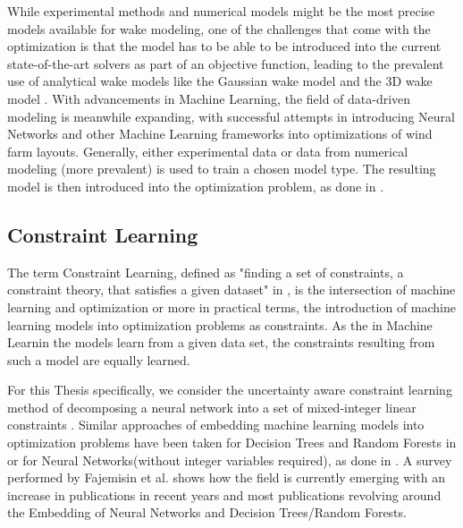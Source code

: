 \documentclass[preprint,12pt]{elsarticle}
\begin{document}
While experimental methods and numerical models might be the most precise models available for wake modeling, one of the challenges that come with the optimization is that the model has to be able to be introduced into the current state-of-the-art solvers as part of an objective function, leading to the prevalent use of analytical wake models like the Gaussian wake model and the 3D wake model  \cite{WANG2024118508}. With advancements in Machine Learning, the field of data-driven modeling is meanwhile expanding, with successful attempts in introducing Neural Networks and other Machine Learning frameworks into optimizations of wind farm layouts. Generally, either experimental data or data from numerical modeling (more prevalent) is used to train  a chosen model type. The resulting model is then introduced into the optimization problem, as done in \cite{YANG2023119240} \cite{wes-9-869-2024} \cite{TI2020114025} \cite{TI2021618}. 

\subsection{Constraint Learning}

The term Constraint Learning, defined as "finding a set of constraints, a constraint theory, that satisfies a given dataset" in \cite{de2018learning}, is the intersection of machine learning and optimization or more in practical terms, the introduction of machine learning models into optimization problems as constraints. As the in Machine Learnin the models learn from a given data set, the constraints resulting from such a model are equally learned. \cite{de2018learning} 

For this Thesis specifically, we consider the uncertainty aware constraint learning method of decomposing a neural network into a set of mixed-integer linear constraints  \cite{ALCANTARA2023120895} \cite{ALCANTARA2025127876}. Similar approaches of embedding machine learning models into optimization problems have been taken for Decision Trees and Random Forests in \cite{preprintBonfiettiEmbeddDecisionTrees} or for Neural Networks(without integer variables required), as done in \cite{dealba2024reformulationembeddingneuralnetwork}. A survey performed by Fajemisin et al.\cite{FAJEMISIN20241} shows how the field is currently emerging with an increase in publications in recent years and most publications revolving around the Embedding of Neural Networks and Decision Trees/Random Forests.
\end{document}
